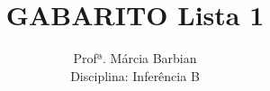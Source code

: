 \documentclass[10pt,brazil,addpoints]{exam}
\begin{document}
\title{GABARITO Lista 1}


\author{
  Profª. Márcia Barbian \\
  Disciplina: Inferência B\\
  \date{}
}


\maketitle
\end{document}
